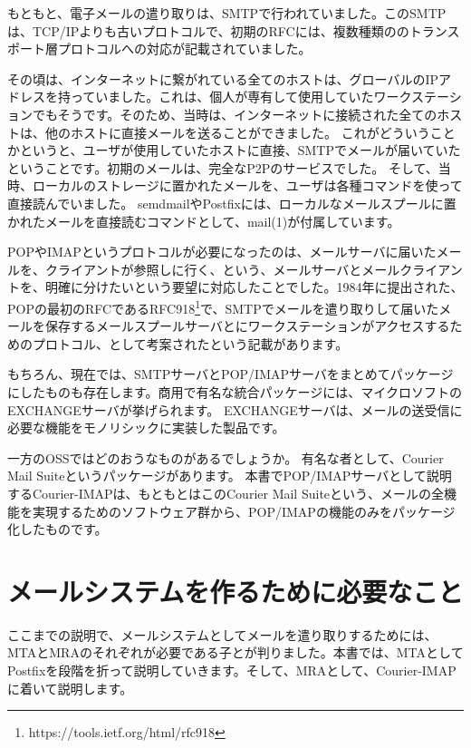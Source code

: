 もともと、電子メールの遣り取りは、SMTPで行われていました。このSMTPは、TCP/IPよりも古いプロトコルで、初期のRFCには、複数種類ののトランスポート層プロトコルへの対応が記載されていました。

その頃は、インターネットに繋がれている全てのホストは、グローバルのIPアドレスを持っていました。これは、個人が専有して使用していたワークステーションでもそうです。そのため、当時は、インターネットに接続された全てのホストは、他のホストに直接メールを送ることができました。
これがどういうことかというと、ユーザが使用していたホストに直接、SMTPでメールが届いていたということです。初期のメールは、完全なP2Pのサービスでした。
そして、当時、ローカルのストレージに置かれたメールを、ユーザは各種コマンドを使って直接読んでいました。
semdmailやPostfixには、ローカルなメールスプールに置かれたメールを直接読むコマンドとして、mail(1)が付属しています。


POPやIMAPというプロトコルが必要になったのは、メールサーバに届いたメールを、クライアントが参照しに行く、という、メールサーバとメールクライアントを、明確に分けたいという要望に対応したことでした。1984年に提出された、POPの最初のRFCであるRFC918\footnote{https://tools.ietf.org/html/rfc918}で、SMTPでメールを遣り取りして届いたメールを保存するメールスプールサーバとにワークステーションがアクセスするためのプロトコル、として考案されたという記載があります。



もちろん、現在では、SMTPサーバとPOP/IMAPサーバをまとめてパッケージにしたものも存在します。商用で有名な統合パッケージには、マイクロソフトのEXCHANGEサーバが挙げられます。
EXCHANGEサーバは、メールの送受信に必要な機能をモノリシックに実装した製品です。

一方のOSSではどのおうなものがあるでしょうか。
有名な者として、Courier Mail Suiteというパッケージがあります。
本書でPOP/IMAPサーバとして説明するCourier-IMAPは、もともとはこのCourier Mail Suiteという、メールの全機能を実現するためのソフトウェア群から、POP/IMAPの機能のみをパッケージ化したものです。





\section{メールシステムを作るために必要なこと}

ここまでの説明で、メールシステムとしてメールを遣り取りするためには、MTAとMRAのそれぞれが必要である子とが判りました。本書では、MTAとしてPostfixを段階を折って説明していきます。そして、MRAとして、Courier-IMAPに着いて説明します。

